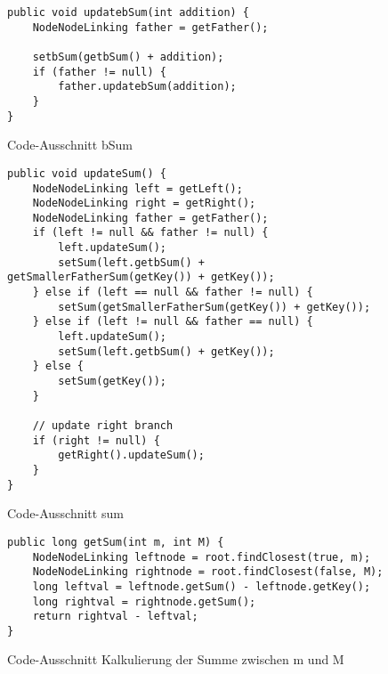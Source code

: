 \documentclass[11pt]{scrartcl}
\begin{document}
\begin{figure}
\begin{verbatim}
public void updatebSum(int addition) {
    NodeNodeLinking father = getFather();

    setbSum(getbSum() + addition);
    if (father != null) {
        father.updatebSum(addition);
    }
}
\end{verbatim}
\caption{Code-Ausschnitt bSum}
\label{figure:bSum}
\end{figure}

\begin{figure}
\begin{verbatim}
public void updateSum() {
    NodeNodeLinking left = getLeft();
    NodeNodeLinking right = getRight();
    NodeNodeLinking father = getFather();
    if (left != null && father != null) {
        left.updateSum();
        setSum(left.getbSum() + getSmallerFatherSum(getKey()) + getKey());
    } else if (left == null && father != null) {
        setSum(getSmallerFatherSum(getKey()) + getKey());
    } else if (left != null && father == null) {
        left.updateSum();
        setSum(left.getbSum() + getKey());
    } else {
        setSum(getKey());
    }

    // update right branch
    if (right != null) {
        getRight().updateSum();
    }
}
\end{verbatim}
\caption{Code-Ausschnitt sum}
\label{figure:sum}
\end{figure}

\begin{figure}
\begin{verbatim}
public long getSum(int m, int M) {
    NodeNodeLinking leftnode = root.findClosest(true, m);
    NodeNodeLinking rightnode = root.findClosest(false, M);
    long leftval = leftnode.getSum() - leftnode.getKey();
    long rightval = rightnode.getSum();
    return rightval - leftval;
}
\end{verbatim}
\caption{Code-Ausschnitt Kalkulierung der Summe zwischen m und M}
\label{figure:sumCalc}
\end{figure}
\end{document}
